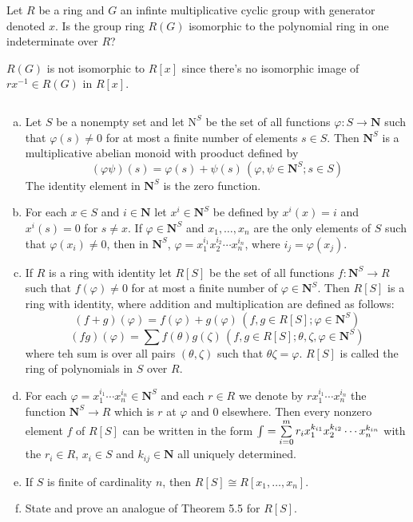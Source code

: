 $$ $$

\begin{ex}
    Let $R$ be a ring and $G$ an infinte multiplicative cyclic group with generator denoted $x$. Is the group ring $R(G)$ isomorphic to the polynomial ring in one indeterminate over $R$?
\end{ex}

\begin{answer}
    $R(G)$ is not isomorphic to $R[x]$ since there's no isomorphic image of $rx^{-1}\in R(G)$ in $R[x]$.
\end{answer}

$$ $$

\begin{ex}
    \begin{enumerate}[(a)]
        \item Let $S$ be a nonempty set and let $\mathrm{N}^{S}$ be the set of all functions $\varphi:S\to \mathbf{N}$ such that $\varphi(s)\neq 0$ for at most a finite number of elements $s\in S$. Then $\mathbf{N}^{S}$ is a multiplicative abelian monoid with prooduct defined by \[(\varphi \psi)(s)=\varphi(s)+\psi(s)\, (\varphi,\psi\in \mathbf{N}^{S};s\in S)\]The identity element in $\mathbf{N}^{S}$ is the zero function.
        \item For each $x\in S$ and $i\in \mathbf{N}$ let $x^{i}\in \mathbf{N}^{S}$ be defined by $x^{i}(x)=i$ and $x^{i}(s)=0$ for $s\neq x$. If $\varphi\in\mathbf{N}^{S}$ and $x_{1},\dots,x_{n}$ are the only elements of $S$ such that $\varphi(x_{i})\neq 0$, then in $\mathbf{N}^{S}$, $\varphi=x_{1}^{i_{1}}x_{2}^{i_{2}}\cdots x_{n}^{i_{n}}$, where $i_{j}=\varphi(x_{j})$.
        \item If $R$ is a ring with identity let $R[S]$ be the set of all functions $f:\mathbf{N}^{S}\to R$ such that $f(\varphi)\neq 0$ for at most a finite number of $\varphi\in \mathbf{N}^{S}$. Then $R[S]$ is a ring with identity, where addition and multiplication are defined as follows:\[(f+g)(\varphi)=f(\varphi)+g(\varphi)\,(f,g\in R[S];\varphi\in \mathbf{N}^{S})\]\[(fg)(\varphi)=\sum f(\theta)g(\zeta)\,(f,g\in R[S]; \theta,\zeta,\varphi\in \mathbf{N}^{S})\] where teh sum is over all pairs $(\theta,\zeta)$ such that $\theta \zeta=\varphi$. $R[S]$ is called the ring of polynomials in $S$ over $R$.
        \item For each $\varphi=x_{1}^{i_{1}}\cdots x_{n}^{i_{n}}\in \mathbf{N}^{S}$ and each $r\in R$ we denote by $rx_{1}^{i_{1}}\cdots x_{n}^{i_{n}}$ the function $\mathbf{N}^{S}\to R$ which is $r$ at $\varphi$ and 0 elsewhere. Then every nonzero element $f$ of $R[S]$ can be written in the form $\int =\sum\limits_{i=0}^{m}r_{i}x_{1}^{k_{i1}}x_{2}^{k_{i2}}\\\cdots x_{n}^{k_{in}}$ with the $r_{i}\in R$, $x_{i}\in S$ and $k_{ij}\in\mathbf{N}$ all uniquely determined.
        \item If $S$ is finite of cardinality $n$, then $R[S]\cong R[x_{1},\dots,x_{n}]$.
        \item State and prove an analogue of Theorem 5.5 for $R[S]$.
    \end{enumerate}
\end{ex}

